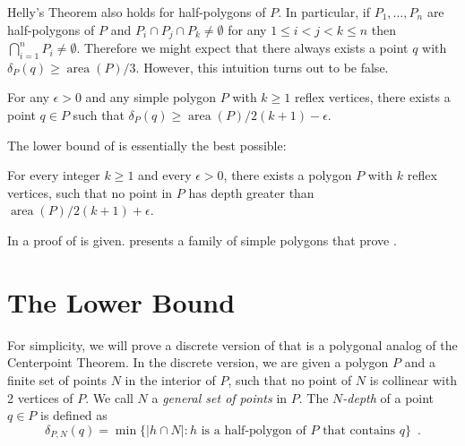 \documentclass{article}
\DeclareMathOperator{\area}{area}
\begin{document}
Helly's Theorem also holds
for half-polygons of $P$.  In particular, if $P_1,\ldots,P_n$ are
half-polygons of $P$ and $P_i\cap P_j\cap P_k\neq \emptyset$ for any
$1\le i < j < k\le n$ then $\bigcap_{i=1}^n P_i\neq \emptyset$.
Therefore we might expect that there always exists a point $q$ with
$\delta_P(q)\ge \area(P)/3$.  However, this intuition turns out to be
false.

\begin{thm}
For any $\epsilon > 0$ and any simple polygon $P$ with $k \ge 1$
reflex vertices, there exists a point $q\in P$ such that
$\delta_P(q)\ge \area(P)/2(k+1)-\epsilon$.
\end{thm}

The lower bound of  is essentially the best
possible:

\begin{thm}
For every integer $k\ge 1$ and every $\epsilon > 0$,
there exists a polygon $P$ with $k$ reflex vertices, such that no point
in $P$ has depth greater than  $\area(P)/2(k+1) + \epsilon$.
\end{thm}

In  a proof of  is given.
 presents a family of simple polygons that prove
.

\section{The Lower Bound}

For simplicity, we will prove a discrete version of
 that is a polygonal analog of the Centerpoint
Theorem.  In the discrete version, we are given a polygon $P$ and a
finite set of points $N$ in the interior of $P$, such that no point of
$N$ is collinear with 2 vertices of $P$.  We call $N$ a \emph{general
set of points} in $P$. The \emph{$N$-depth} of a point $q\in P$ is
defined as 
\[
     \delta_{P,N}(q) = \min\{|h\cap N| : \mbox{$h$ is a half-polygon
	of $P$ that contains $q$} \} \enspace .
\]
\end{document}
